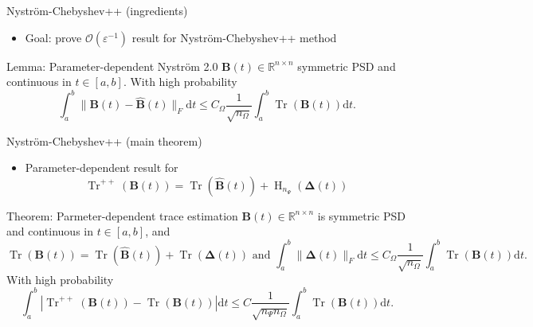 \documentclass[aspectratio=169, leqno, 12pt]{beamer}
\newcommand{\mtx}[1]{\boldsymbol{#1}}
\DeclareMathOperator{\Tr}{Tr}
\DeclareMathOperator{\Hutch}{H}
\begin{document}
\begin{frame}{Nystr\"om-Chebyshev++ (ingredients)}
    \begin{itemize}
        \item Goal: prove $\mathcal{O}(\varepsilon^{-1})$ result for Nystr\"om-Chebyshev++ method
    \end{itemize}
    \begin{block}{Lemma: Parameter-dependent Nystr\"om 2.0 \cite{he2023parameter}}
        $\mtx{B}(t) \in \mathbb{R}^{n \times n}$ symmetric \gls{PSD} and
        continuous in $t \in [a, b]$. With high probability
        \begin{equation}
            \int_{a}^{b} \lVert \mtx{B}(t) - \widehat{\mtx{B}}(t) \rVert _F \mathrm{d}t \leq C_{\Omega} \frac{1}{\sqrt{n_{\Omega}}} \int_{a}^{b} \Tr(\mtx{B}(t)) \mathrm{d}t.
        \end{equation}
    \end{block}
\end{frame}

\begin{frame}{Nystr\"om-Chebyshev++ (main theorem)}
    \begin{itemize}
        \item Parameter-dependent result for \cite{meyer2021hutch}
        \begin{equation}
            \Tr^{++}(\mtx{B}(t)) = \Tr(\widehat{\mtx{B}}(t)) + \Hutch_{n_{\Psi}}(\mtx{\Delta}(t))
        \end{equation}
    \end{itemize}
    \begin{block}{Theorem: Parmeter-dependent trace estimation}
        $\mtx{B}(t) \in \mathbb{R}^{n \times n}$ is symmetric \gls{PSD}
        and continuous in $t \in [a, b]$, and
        \begin{equation}
            \Tr(\mtx{B}(t)) = \Tr(\widehat{\mtx{B}}(t)) + \Tr(\mtx{\Delta}(t)) \text{ and } \int_{a}^{b} \lVert \mtx{\Delta}(t) \rVert _F \mathrm{d}t \leq C_{\Omega} \frac{1}{\sqrt{n_{\Omega}}} \int_{a}^{b} \Tr(\mtx{B}(t)) \mathrm{d}t.
        \end{equation}
        With high probability
        \begin{equation}
            \int_{a}^{b} |\Tr^{++}(\mtx{B}(t)) - \Tr(\mtx{B}(t))| \mathrm{d}t \leq C \frac{1}{\sqrt{n_{\Psi} n_{\Omega}}} \int_{a}^{b} \Tr(\mtx{B}(t)) \mathrm{d}t.
        \end{equation}
    \end{block}
\end{frame}
\end{document}
